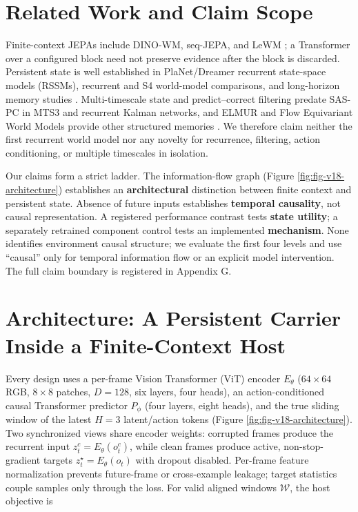 \section{Related Work and Claim
Scope}\label{related-work-and-claim-scope}

Finite-context JEPAs include DINO-WM, seq-JEPA, and LeWM
\citep{ref1,ref2,ref3}; a Transformer over a configured block need not
preserve evidence after the block is discarded. Persistent state is well
established in PlaNet/Dreamer recurrent state-space models (RSSMs),
recurrent and S4 world-model comparisons, and long-horizon memory
studies \citep{ref6,ref7,ref8,ref9,ref10}. Multi-timescale state and
predict--correct filtering predate SAS-PC in MTS3 and recurrent Kalman
networks, and ELMUR and Flow Equivariant World Models provide other
structured memories \citep{ref11,ref12,ref13,ref14,ref15}. We therefore
claim neither the first recurrent world model nor any novelty for
recurrence, filtering, action conditioning, or multiple timescales in
isolation.

Our claims form a strict ladder. The information-flow graph (Figure
\ref{fig:fig-v18-architecture}) establishes an \textbf{architectural}
distinction between finite context and persistent state. Absence of
future inputs establishes \textbf{temporal causality}, not causal
representation. A registered performance contrast tests \textbf{state
utility}; a separately retrained component control tests an implemented
\textbf{mechanism}. None identifies environment causal structure; we
evaluate the first four levels and use ``causal'' only for temporal
information flow or an explicit model intervention. The full claim
boundary is registered in Appendix G.

\section{Architecture: A Persistent Carrier Inside a Finite-Context
Host}\label{architecture-a-persistent-carrier-inside-a-finite-context-host}

Every design uses a per-frame Vision Transformer (ViT) encoder
\(E_\theta\) (\(64\times64\) RGB, \(8\times8\) patches, \(D=128\),
six layers, four heads), an action-conditioned causal Transformer
predictor \(P_\phi\) (four layers, eight heads), and the true sliding
window of the latest \(H=3\) latent/action tokens (Figure
\ref{fig:fig-v18-architecture}). Two synchronized views share encoder
weights: corrupted frames produce the recurrent input \(z_t^c=E_\theta(o_t^c)\),
while clean frames produce active, non-stop-gradient targets
\(z_t^\star=E_\theta(o_t)\) with dropout disabled. Per-frame feature normalization
prevents future-frame or cross-example leakage; target statistics couple
samples only through the loss. For valid aligned windows \(\mathcal W\),
the host objective is

